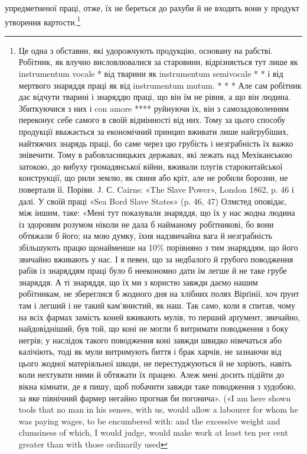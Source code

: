 упредметненої праці, отже, їх не береться до рахуби й не входять
вони у продукт утворення вартости.\footnote{
Це одна з обставин, які удорожчують продукцію, основану на
рабстві. Робітник, як влучно висловлювалися за старовини, відрізняється
тут лише як instrumentum vocale * від тварини як instrumentum semivocale
* * і від мертвого знаряддя праці як від instrumentum mutum. * * *
Але сам робітник дає відчути тварині і знаряддю праці, що він їм не
рівня, а що він людина. Збиткуючися з них і con amore **** руйнуючи їх,
він з самозадоволенням переконує себе самого в своїй відмінності від них.
Тому за цього способу продукції вважається за економічний принцип
вживати лише найгрубіших, найтяжчих знарядь праці, бо саме через
цю грубість і незграбність їх важко знівечити. Тому в рабовласницьких
державах, які лежать над Мехіканською затокою, до вибуху громадянської
війни, вживали плугів старокитайської конструкції, що рили землю,
як свиня або кріт, але не робили борозни, не повертали її. Порівн.
J. С. Cairns: «The Slave Power», London 1862, p. 46 і далі. У своїй праці
«Sea Bord Slave States» (p. 46, 47) Олмстед оповідає, між іншим, таке:
«Мені тут показували знаряддя, що їх у нас жодна людина із здоровим
розумом ніколи не дала б найманому робітникові, бо вони обтяжали б
його; на мою думку, їхня надзвичайна вага й незграбність збільшують
працю щонайменше на 10\% порівняно з тим знаряддям, що його звичайно
вживають у нас. І я певен, що за недбалого й грубого поводження рабів
із знаряддям праці було б неекономно дати їм легше й не таке грубе знаряддя.
А ті знаряддя, що їх ми з користю завжди даємо нашим робітникам,
не збереглися б жодного дня на хлібних полях Вірґінії, хоч ґрунт там
і легший і не такий кам’янистий, як наш. Так само, коли я спитав, чому
на всіх фармах замість коней вживають мулів, то перший арґумент, звичайно,
найдовідніший, був той, що коні не могли б витримати поводження
з боку негрів; у наслідок такого поводження коні завжди швидко нівечаться
або калічіють, тоді як мули витримують биття і брак харчів, не
зазнаючи від цього жодної матеріяльної шкоди, не перестуджуються й не
хоріють, навіть коли нехтувати ними й обтяжати їх працею. Алеж мені
досить підійти до вікна кімнати, де я пишу, щоб побачити завжди таке
поводження з худобою, за яке північний фармер негайно прогнав би погонича».
(«І am here shown tools that no man in his senses, with us, would
allow a labourer for whom he was paying wages, to be encumbered with:
and the excessive weight and clumsiness of which, I would judge, would
make work at least ten per cent greater than with those ordinarily used
}
